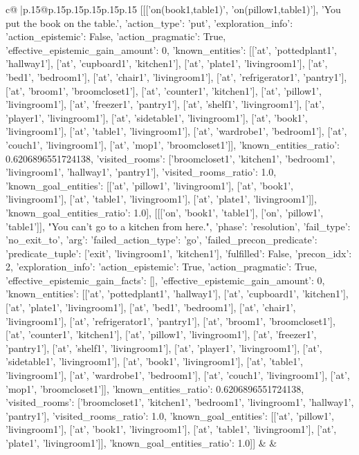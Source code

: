 \documentclass{article}
\begin{document}
{\begin{supertabular}{c@{$\;$}|p{.15\linewidth}@{}p{.15\linewidth}p{.15\linewidth}p{.15\linewidth}p{.15\linewidth}p{.15\linewidth}}
{{{	 [[['on(book1,table1)', 'on(pillow1,table1)'], 'You put the book on the table.', {'action_type': 'put', 'exploration_info': {'action_epistemic': False, 'action_pragmatic': True, 'effective_epistemic_gain_amount': 0, 'known_entities': [['at', 'pottedplant1', 'hallway1'], ['at', 'cupboard1', 'kitchen1'], ['at', 'plate1', 'livingroom1'], ['at', 'bed1', 'bedroom1'], ['at', 'chair1', 'livingroom1'], ['at', 'refrigerator1', 'pantry1'], ['at', 'broom1', 'broomcloset1'], ['at', 'counter1', 'kitchen1'], ['at', 'pillow1', 'livingroom1'], ['at', 'freezer1', 'pantry1'], ['at', 'shelf1', 'livingroom1'], ['at', 'player1', 'livingroom1'], ['at', 'sidetable1', 'livingroom1'], ['at', 'book1', 'livingroom1'], ['at', 'table1', 'livingroom1'], ['at', 'wardrobe1', 'bedroom1'], ['at', 'couch1', 'livingroom1'], ['at', 'mop1', 'broomcloset1']], 'known_entities_ratio': 0.6206896551724138, 'visited_rooms': ['broomcloset1', 'kitchen1', 'bedroom1', 'livingroom1', 'hallway1', 'pantry1'], 'visited_rooms_ratio': 1.0, 'known_goal_entities': [['at', 'pillow1', 'livingroom1'], ['at', 'book1', 'livingroom1'], ['at', 'table1', 'livingroom1'], ['at', 'plate1', 'livingroom1']], 'known_goal_entities_ratio': 1.0}}], [[['on', 'book1', 'table1'], ['on', 'pillow1', 'table1']], "You can't go to a kitchen from here.", {'phase': 'resolution', 'fail_type': 'no_exit_to', 'arg': {'failed_action_type': 'go', 'failed_precon_predicate': {'predicate_tuple': ['exit', 'livingroom1', 'kitchen1'], 'fulfilled': False, 'precon_idx': 2}}, 'exploration_info': {'action_epistemic': True, 'action_pragmatic': True, 'effective_epistemic_gain_facts': [], 'effective_epistemic_gain_amount': 0, 'known_entities': [['at', 'pottedplant1', 'hallway1'], ['at', 'cupboard1', 'kitchen1'], ['at', 'plate1', 'livingroom1'], ['at', 'bed1', 'bedroom1'], ['at', 'chair1', 'livingroom1'], ['at', 'refrigerator1', 'pantry1'], ['at', 'broom1', 'broomcloset1'], ['at', 'counter1', 'kitchen1'], ['at', 'pillow1', 'livingroom1'], ['at', 'freezer1', 'pantry1'], ['at', 'shelf1', 'livingroom1'], ['at', 'player1', 'livingroom1'], ['at', 'sidetable1', 'livingroom1'], ['at', 'book1', 'livingroom1'], ['at', 'table1', 'livingroom1'], ['at', 'wardrobe1', 'bedroom1'], ['at', 'couch1', 'livingroom1'], ['at', 'mop1', 'broomcloset1']], 'known_entities_ratio': 0.6206896551724138, 'visited_rooms': ['broomcloset1', 'kitchen1', 'bedroom1', 'livingroom1', 'hallway1', 'pantry1'], 'visited_rooms_ratio': 1.0, 'known_goal_entities': [['at', 'pillow1', 'livingroom1'], ['at', 'book1', 'livingroom1'], ['at', 'table1', 'livingroom1'], ['at', 'plate1', 'livingroom1']], 'known_goal_entities_ratio': 1.0}}]] 
	  } 
	   } 
	   } 
	 & & \\ 
 


\end{supertabular}}
\end{document}
